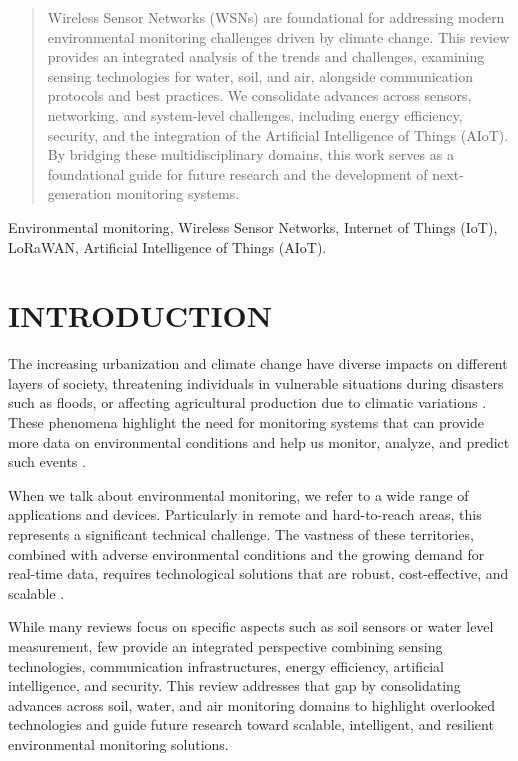 \maketitle

\begin{abstract}
Wireless Sensor Networks (WSNs) are foundational for addressing modern environmental monitoring challenges driven by climate change. This review provides an integrated analysis of the trends and challenges, examining sensing technologies for water, soil, and air, alongside communication protocols and best practices. We consolidate advances across sensors, networking, and system-level challenges, including energy efficiency, security, and the integration of the Artificial Intelligence of Things (AIoT). By bridging these multidisciplinary domains, this work serves as a foundational guide for future research and the development of next-generation monitoring systems.
\end{abstract}

\begin{IEEEkeywords}
Environmental monitoring, Wireless Sensor Networks, Internet of Things (IoT), LoRaWAN, Artificial Intelligence of Things (AIoT).
\end{IEEEkeywords}

\section{INTRODUCTION}
The increasing urbanization and climate change have diverse impacts on different layers of society, threatening individuals in vulnerable situations during disasters such as floods, or affecting agricultural production due to climatic variations \cite{jonkman_2005_global}. These phenomena highlight the need for monitoring systems that can provide more data on environmental conditions and help us monitor, analyze, and predict such events \cite{hall_2014_understanding}.

When we talk about environmental monitoring, we refer to a wide range of applications and devices. Particularly in remote and hard-to-reach areas, this represents a significant technical challenge. The vastness of these territories, combined with adverse environmental conditions and the growing demand for real-time data, requires technological solutions that are robust, cost-effective, and scalable \cite{chen_2013_natural, yellampalli_2021_wireless }.

While many reviews focus on specific aspects such as soil sensors or water level measurement, few provide an integrated perspective combining sensing technologies, communication infrastructures, energy efficiency, artificial intelligence, and security. This review addresses that gap by consolidating advances across soil, water, and air monitoring domains to highlight overlooked technologies and guide future research toward scalable, intelligent, and resilient environmental monitoring solutions.

